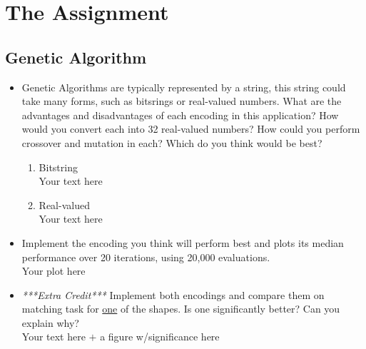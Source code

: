 \documentclass{article}
\begin{document}
\newpage


\newpage
\section{The Assignment}

\subsection{Genetic Algorithm}
\begin{itemize}
	\item Genetic Algorithms are typically represented by a string, this string could take many forms, such as bitsrings or real-valued numbers. What are the advantages and disadvantages of each encoding in this application? How would you convert each into 32 real-valued numbers? How could you perform crossover and mutation in each? Which do you think would be best?
	\begin{enumerate}
		\item Bitstring
		\\\color{red}Your text here\color{black}
		\item Real-valued
		\\\color{red}Your text here\color{black}
	\end{enumerate}
	\item Implement the encoding you think will perform best and plots its median performance over 20 iterations, using 20,000 evaluations.
	\\\color{red}Your plot here\color{black}

	\item \textit{***Extra Credit***} Implement both encodings and compare them on matching task for \underline{one} of the shapes. Is one significantly better? Can you explain why?
	\\\color{red}Your text here $+$ a figure w/significance here\color{black}
\end{itemize}

\newpage
\end{document}
